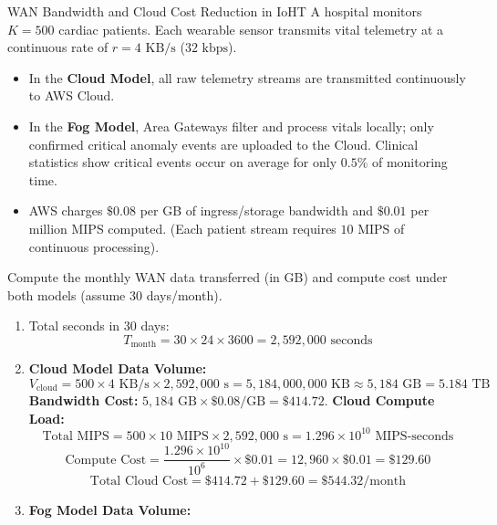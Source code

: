 \begin{solved}{WAN Bandwidth and Cloud Cost Reduction in IoHT}
\Given A hospital monitors $K = 500$ cardiac patients. Each wearable sensor transmits vital telemetry at a continuous rate of $r = 4\text{ KB/s}$ ($32\text{ kbps}$).
\begin{itemize}[leftmargin=*]
  \item In the \textbf{Cloud Model}, all raw telemetry streams are transmitted continuously to AWS Cloud.
  \item In the \textbf{Fog Model}, Area Gateways filter and process vitals locally; only confirmed critical anomaly events are uploaded to the Cloud. Clinical statistics show critical events occur on average for only $0.5\%$ of monitoring time.
  \item AWS charges $\$0.08$ per GB of ingress/storage bandwidth and $\$0.01$ per million MIPS computed. (Each patient stream requires $10\text{ MIPS}$ of continuous processing).
\end{itemize}
Compute the monthly WAN data transferred (in GB) and compute cost under both models (assume 30 days/month).
\Steps
\begin{enumerate}[leftmargin=*]
  \item Total seconds in 30 days:
  \begin{equation}
  T_{\text{month}} = 30 \times 24 \times 3600 = 2,592,000\text{ seconds}
  \end{equation}
  \item \textbf{Cloud Model Data Volume:}
  \begin{equation}
  V_{\text{cloud}} = 500 \times 4\text{ KB/s} \times 2,592,000\text{ s} = 5,184,000,000\text{ KB} \approx 5,184\text{ GB} = 5.184\text{ TB}
  \end{equation}
  \textbf{Bandwidth Cost:} $5,184\text{ GB} \times \$0.08/\text{GB} = \$414.72$.
  \textbf{Cloud Compute Load:}
  \begin{equation}
  \text{Total MIPS} = 500 \times 10\text{ MIPS} \times 2,592,000\text{ s} = 1.296 \times 10^{10}\text{ MIPS-seconds}
  \end{equation}
  \begin{equation}
  \text{Compute Cost} = \frac{1.296 \times 10^{10}}{10^6} \times \$0.01 = 12,960 \times \$0.01 = \$129.60
  \end{equation}
  \begin{equation}
  \text{Total Cloud Cost} = \$414.72 + \$129.60 = \$544.32/\text{month}
  \end{equation}
  \item \textbf{Fog Model Data Volume:}

\end{enumerate}
\end{solved}
